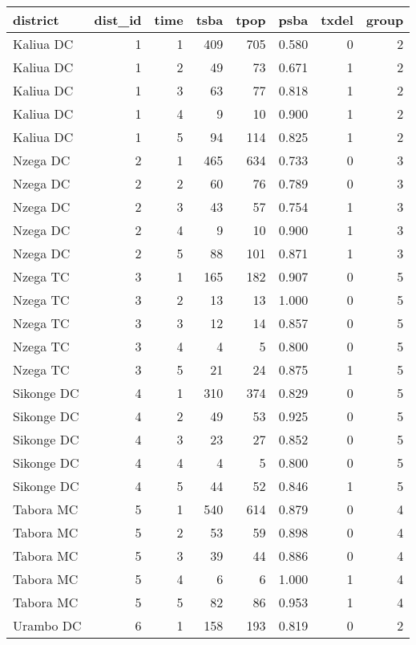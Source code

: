 \documentclass[
]{article}
\begin{document}
\begin{table}
\centering
\begin{tabular}[t]{l|r|r|r|r|r|r|r}
\hline
district & dist_id & time & tsba & tpop & psba & txdel & group\\
\hline
Kaliua DC & 1 & 1 & 409 & 705 & 0.580 & 0 & 2\\
\hline
Kaliua DC & 1 & 2 & 49 & 73 & 0.671 & 1 & 2\\
\hline
Kaliua DC & 1 & 3 & 63 & 77 & 0.818 & 1 & 2\\
\hline
Kaliua DC & 1 & 4 & 9 & 10 & 0.900 & 1 & 2\\
\hline
Kaliua DC & 1 & 5 & 94 & 114 & 0.825 & 1 & 2\\
\hline
Nzega DC & 2 & 1 & 465 & 634 & 0.733 & 0 & 3\\
\hline
Nzega DC & 2 & 2 & 60 & 76 & 0.789 & 0 & 3\\
\hline
Nzega DC & 2 & 3 & 43 & 57 & 0.754 & 1 & 3\\
\hline
Nzega DC & 2 & 4 & 9 & 10 & 0.900 & 1 & 3\\
\hline
Nzega DC & 2 & 5 & 88 & 101 & 0.871 & 1 & 3\\
\hline
Nzega TC & 3 & 1 & 165 & 182 & 0.907 & 0 & 5\\
\hline
Nzega TC & 3 & 2 & 13 & 13 & 1.000 & 0 & 5\\
\hline
Nzega TC & 3 & 3 & 12 & 14 & 0.857 & 0 & 5\\
\hline
Nzega TC & 3 & 4 & 4 & 5 & 0.800 & 0 & 5\\
\hline
Nzega TC & 3 & 5 & 21 & 24 & 0.875 & 1 & 5\\
\hline
Sikonge DC & 4 & 1 & 310 & 374 & 0.829 & 0 & 5\\
\hline
Sikonge DC & 4 & 2 & 49 & 53 & 0.925 & 0 & 5\\
\hline
Sikonge DC & 4 & 3 & 23 & 27 & 0.852 & 0 & 5\\
\hline
Sikonge DC & 4 & 4 & 4 & 5 & 0.800 & 0 & 5\\
\hline
Sikonge DC & 4 & 5 & 44 & 52 & 0.846 & 1 & 5\\
\hline
Tabora MC & 5 & 1 & 540 & 614 & 0.879 & 0 & 4\\
\hline
Tabora MC & 5 & 2 & 53 & 59 & 0.898 & 0 & 4\\
\hline
Tabora MC & 5 & 3 & 39 & 44 & 0.886 & 0 & 4\\
\hline
Tabora MC & 5 & 4 & 6 & 6 & 1.000 & 1 & 4\\
\hline
Tabora MC & 5 & 5 & 82 & 86 & 0.953 & 1 & 4\\
\hline
Urambo DC & 6 & 1 & 158 & 193 & 0.819 & 0 & 2\\

\end{tabular}
\end{table}
\end{document}

